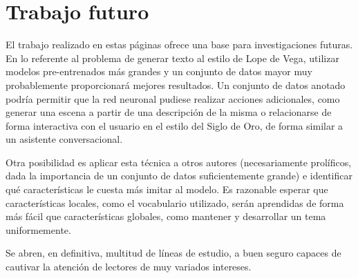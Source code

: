 \section{Trabajo futuro}
El trabajo realizado en estas páginas ofrece una base para investigaciones futuras. En lo referente al problema de generar texto al estilo de Lope de Vega, utilizar modelos pre-entrenados más grandes y un conjunto de datos mayor muy probablemente proporcionará mejores resultados. Un conjunto de datos anotado podría permitir que la red neuronal pudiese realizar acciones adicionales, como generar una escena a partir de una descripción de la misma o relacionarse de forma interactiva con el usuario en el estilo del Siglo de Oro, de forma similar a un asistente conversacional. 

Otra posibilidad es aplicar esta técnica a otros autores  (necesariamente prolíficos, dada la importancia de un conjunto de datos suficientemente grande) e identificar qué características le cuesta más imitar al modelo. Es razonable esperar que características  locales, como el vocabulario utilizado, serán aprendidas de forma más fácil que características globales, como mantener y desarrollar un tema uniformemente.

Se abren, en definitiva, multitud de líneas de estudio, a buen seguro capaces de cautivar la atención de lectores de muy variados intereses.